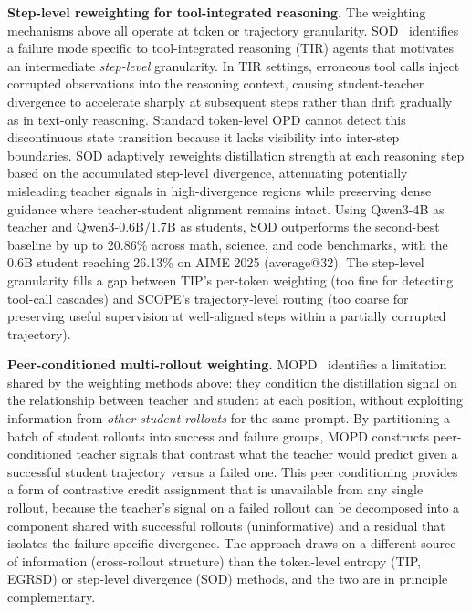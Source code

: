 \documentclass{article} %
\begin{document}
\textbf{Step-level reweighting for tool-integrated reasoning.} The weighting mechanisms above all operate at token or trajectory granularity. SOD~\citep{2605.07725} identifies a failure mode specific to tool-integrated reasoning (TIR) agents that motivates an intermediate \emph{step-level} granularity. In TIR settings, erroneous tool calls inject corrupted observations into the reasoning context, causing student-teacher divergence to accelerate sharply at subsequent steps rather than drift gradually as in text-only reasoning. Standard token-level OPD cannot detect this discontinuous state transition because it lacks visibility into inter-step boundaries. SOD adaptively reweights distillation strength at each reasoning step based on the accumulated step-level divergence, attenuating potentially misleading teacher signals in high-divergence regions while preserving dense guidance where teacher-student alignment remains intact. Using Qwen3-4B as teacher and Qwen3-0.6B/1.7B as students, SOD outperforms the second-best baseline by up to 20.86\% across math, science, and code benchmarks, with the 0.6B student reaching 26.13\% on AIME 2025 (average@32). The step-level granularity fills a gap between TIP's per-token weighting (too fine for detecting tool-call cascades) and SCOPE's trajectory-level routing (too coarse for preserving useful supervision at well-aligned steps within a partially corrupted trajectory).

\textbf{Peer-conditioned multi-rollout weighting.} MOPD~\citep{2605.12652} identifies a limitation shared by the weighting methods above: they condition the distillation signal on the relationship between teacher and student at each position, without exploiting information from \emph{other student rollouts} for the same prompt. By partitioning a batch of student rollouts into success and failure groups, MOPD constructs peer-conditioned teacher signals that contrast what the teacher would predict given a successful student trajectory versus a failed one. This peer conditioning provides a form of contrastive credit assignment that is unavailable from any single rollout, because the teacher's signal on a failed rollout can be decomposed into a component shared with successful rollouts (uninformative) and a residual that isolates the failure-specific divergence. The approach draws on a different source of information (cross-rollout structure) than the token-level entropy (TIP, EGRSD) or step-level divergence (SOD) methods, and the two are in principle complementary.
\end{document}
